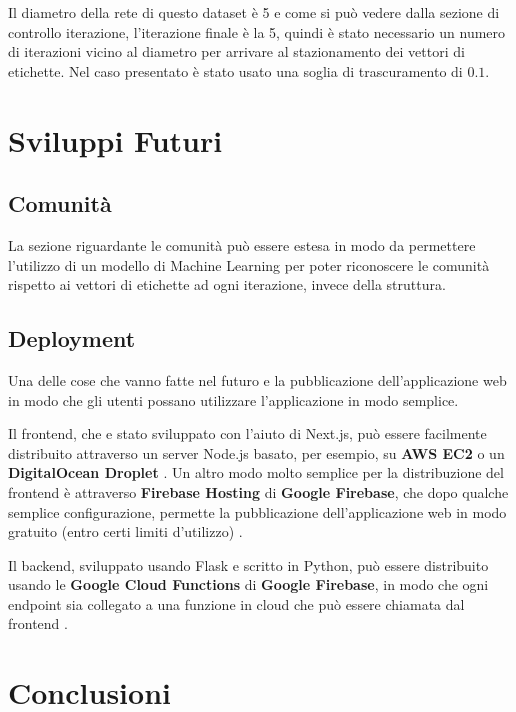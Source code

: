 \documentclass[a4paper,12pt]{report}
\begin{document}
		Il diametro della rete di questo dataset è 5 e come si può vedere dalla sezione di controllo iterazione, l'iterazione finale è la 5, quindi è stato necessario un numero di iterazioni vicino al diametro per arrivare al stazionamento dei vettori di etichette. Nel caso presentato è stato usato una soglia di trascuramento di $0.1$.
	
\chapter{Sviluppi Futuri}

	\section{Comunità}
	
	La sezione riguardante le comunità può essere estesa in modo da permettere l'utilizzo di un modello di Machine Learning per poter riconoscere le comunità rispetto ai vettori di etichette ad ogni iterazione, invece della struttura.

	\section{Deployment}

	Una delle cose che vanno fatte nel futuro e la pubblicazione dell'applicazione web in modo che gli utenti possano utilizzare l'applicazione in modo semplice.

	Il frontend, che e stato sviluppato con l'aiuto di Next.js, può essere facilmente distribuito attraverso un server Node.js basato, per esempio, su \textbf{AWS EC2} o un \textbf{DigitalOcean Droplet} \cite{nextjsdep}. Un altro modo molto semplice per la distribuzione del frontend è attraverso \textbf{Firebase Hosting} di \textbf{Google Firebase}, che dopo qualche semplice configurazione, permette la pubblicazione dell'applicazione web in modo gratuito (entro certi limiti d'utilizzo) \cite{firebasehosting}. 

	Il backend, sviluppato usando Flask e scritto in Python, può essere distribuito usando le \textbf{Google Cloud Functions} di \textbf{Google Firebase}, in modo che ogni endpoint sia collegato a una funzione in cloud che può essere chiamata dal frontend \cite{googlecloudfunctions}.

\chapter{Conclusioni}
\end{document}

